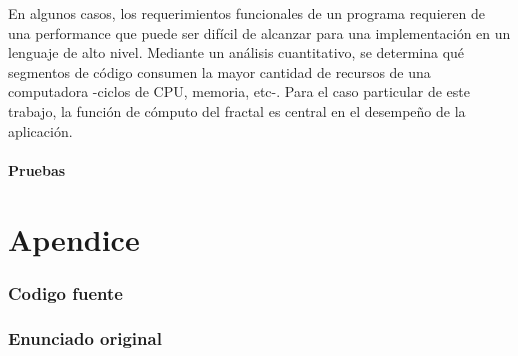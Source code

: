 \documentclass{article}
\begin{document}
En algunos casos, los requerimientos funcionales de un programa requieren de una performance que puede ser difícil de alcanzar para una implementación en un lenguaje de alto nivel. Mediante un análisis cuantitativo, se determina qué segmentos de código consumen la mayor cantidad de recursos de una computadora -ciclos de CPU, memoria, etc-. Para el caso particular de este trabajo, la función de cómputo del fractal es central en el desempeño de la aplicación.

\subsection{Pruebas}

\clearpage

\part{Apendice}
\appendix


\section{Codigo fuente}\label{sec:source}

%
%
%

\clearpage

%
%

\clearpage

\section{Enunciado original}\label{sec:enunciado}

\end{document}
